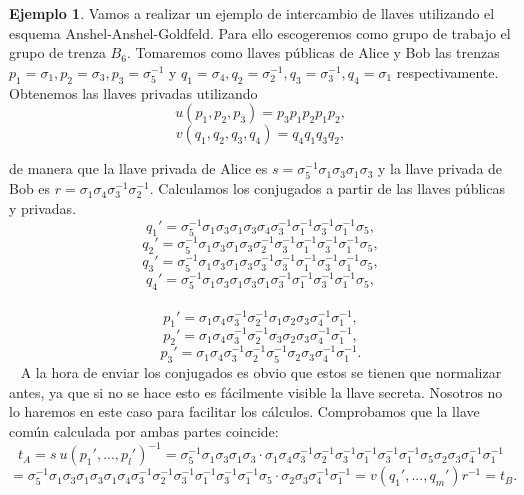 \documentclass[12pt]{article}
\theoremstyle{definition}
\newtheorem{ejem}{Ejemplo}[section]
\begin{document}
\begin{ejem}
Vamos a realizar un ejemplo de intercambio de llaves utilizando el esquema Anshel-Anshel-Goldfeld. Para ello escogeremos como grupo de trabajo el grupo de trenza $B_6$. Tomaremos como llaves públicas de Alice y Bob las trenzas $p_1 = \sigma_1, p_2 = \sigma_3, p_3 =\sigma_5^{-1}$ y $q_1 = \sigma_4, q_2 = \sigma_2^{-1}, q_3 = \sigma_3^{-1}, q_4 = \sigma_1$ respectivamente. Obtenemos las llaves privadas utilizando
$$u(p_1,p_2,p_3)= p_3p_1p_2p_1p_2,$$
$$v(q_1,q_2,q_3,q_4)= q_4q_1q_3q_2,$$

de manera que la llave privada de Alice es $s=\sigma_5^{-1}\sigma_1\sigma_3\sigma_1\sigma_3$ y la llave privada de Bob es $r = \sigma_1\sigma_4\sigma_3^{-1}\sigma_2^{-1}$. Calculamos los conjugados a partir de las llaves públicas y privadas.
$$q_1' = \sigma_5^{-1}\sigma_1\sigma_3\sigma_1\sigma_3 \sigma_4 \sigma_3^{-1}\sigma_1^{-1}\sigma_3^{-1}\sigma_1^{-1}\sigma_5,$$
$$q_2' = \sigma_5^{-1}\sigma_1\sigma_3\sigma_1\sigma_3 \sigma_2^{-1} \sigma_3^{-1}\sigma_1^{-1}\sigma_3^{-1}\sigma_1^{-1}\sigma_5,$$
$$q_3' = \sigma_5^{-1}\sigma_1\sigma_3\sigma_1\sigma_3 \sigma_3^{-1} \sigma_3^{-1}\sigma_1^{-1}\sigma_3^{-1}\sigma_1^{-1}\sigma_5,$$
$$q_4' = \sigma_5^{-1}\sigma_1\sigma_3\sigma_1\sigma_3 \sigma_1 \sigma_3^{-1}\sigma_1^{-1}\sigma_3^{-1}\sigma_1^{-1}\sigma_5,$$
\ 
\newline
$$p_1' = \sigma_1\sigma_4\sigma_3^{-1}\sigma_2^{-1} \sigma_1 \sigma_2\sigma_3\sigma_4^{-1}\sigma_1^{-1},$$
$$p_2' = \sigma_1\sigma_4\sigma_3^{-1}\sigma_2^{-1} \sigma_3 \sigma_2\sigma_3\sigma_4^{-1}\sigma_1^{-1},$$
$$p_3' = \sigma_1\sigma_4\sigma_3^{-1}\sigma_2^{-1} \sigma_5^{-1} \sigma_2\sigma_3\sigma_4^{-1}\sigma_1^{-1}.$$
\ 
\newline
A la hora de enviar los conjugados es obvio que estos se tienen que normalizar antes, ya que si no se hace esto es fácilmente visible la llave secreta. Nosotros no lo haremos en este caso para facilitar los cálculos. Comprobamos que la llave común calculada por ambas partes coincide:
$$t_A = s\ u(p_1',...,p_l')^{-1} = \sigma_5^{-1}\sigma_1\sigma_3\sigma_1\sigma_3\cdot\sigma_1\sigma_4\sigma_3^{-1}\sigma_2^{-1} \sigma_3^{-1} \sigma_1^{-1}\sigma_3^{-1} \sigma_1^{-1}\sigma_5 \sigma_2\sigma_3\sigma_4^{-1}\sigma_1^{-1}$$
$$=\sigma_5^{-1}\sigma_1\sigma_3\sigma_1\sigma_3\sigma_1\sigma_4\sigma_3^{-1}\sigma_2^{-1} \sigma_3^{-1} \sigma_1^{-1}\sigma_3^{-1} \sigma_1^{-1}\sigma_5 \cdot\sigma_2\sigma_3\sigma_4^{-1}\sigma_1^{-1}=v(q_1',...,q_m')r^{-1} = t_B.$$

\end{ejem}
\end{document}

